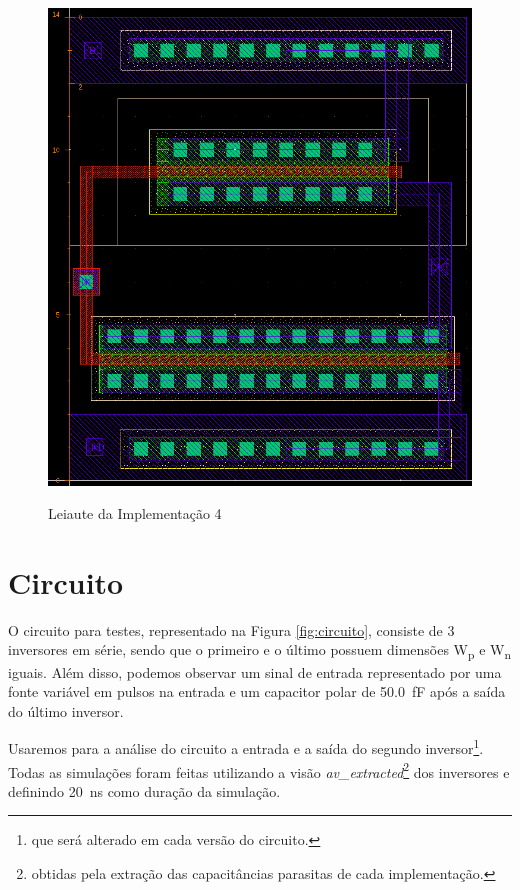 \documentclass{iiufrgs}
\begin{document}
\begin{figure}[htbp]
    \centering
    \caption{Leiaute da Implementação 4}
    \includegraphics[scale=0.8]{images/layout4.png}
    \label{fig:leiaute4}
\end{figure}

\FloatBarrier

\section{Circuito}
O circuito para testes, representado na Figura \ref{fig:circuito}, consiste de 3 inversores em série, sendo que o primeiro e o último possuem dimensões W\textsubscript{p} e W\textsubscript{n} iguais. Além disso, podemos observar um sinal de entrada representado por uma fonte variável em pulsos na entrada e um capacitor polar de \SI{50.0}{\fF} após a saída do último inversor.\

Usaremos para a análise do circuito a entrada e a saída do segundo inversor\footnote{que será alterado em cada versão do circuito.}. Todas as simulações foram feitas utilizando a visão \textit{av\_extracted}\footnote{obtidas pela extração das capacitâncias parasitas de cada implementação.} dos inversores e definindo \SI{20}{\ns} como duração da simulação.
\end{document}
